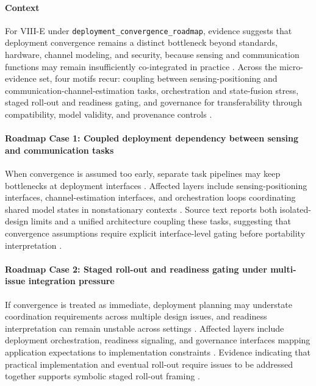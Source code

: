 \paragraph{Context}
For VIII-E under \texttt{deployment\_convergence\_roadmap}, evidence suggests that deployment convergence remains a distinct bottleneck beyond standards, hardware, channel modeling, and security, because sensing and communication functions may remain insufficiently co-integrated in practice \cite{O_ISAC_039}. Across the micro-evidence set, four motifs recur: coupling between sensing-positioning and communication-channel-estimation tasks, orchestration and state-fusion stress, staged roll-out and readiness gating, and governance for transferability through compatibility, model validity, and provenance controls \cite{O_ISAC_039, O_ISAC_151, O_ISAC_163, O_ISAC_200}.

\paragraph{Roadmap Case 1: Coupled deployment dependency between sensing and communication tasks}
When convergence is assumed too early, separate task pipelines may keep bottlenecks at deployment interfaces \cite{O_ISAC_039}. Affected layers include sensing-positioning interfaces, channel-estimation interfaces, and orchestration loops coordinating shared model states in nonstationary contexts \cite{O_ISAC_039}. Source text reports both isolated-design limits and a unified architecture coupling these tasks, suggesting that convergence assumptions require explicit interface-level gating before portability interpretation \cite{O_ISAC_039}.

\paragraph{Roadmap Case 2: Staged roll-out and readiness gating under multi-issue integration pressure}
If convergence is treated as immediate, deployment planning may understate coordination requirements across multiple design issues, and readiness interpretation can remain unstable across settings \cite{O_ISAC_163}. Affected layers include deployment orchestration, readiness signaling, and governance interfaces mapping application expectations to implementation constraints \cite{O_ISAC_163}. Evidence indicating that practical implementation and eventual roll-out require issues to be addressed together supports symbolic staged roll-out framing \cite{O_ISAC_163}.

